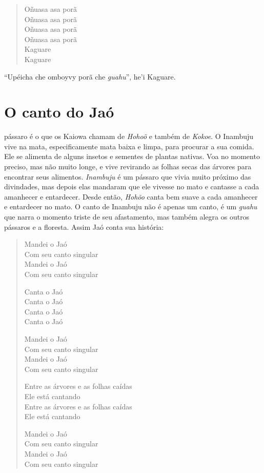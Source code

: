 \begin{verse}
Oñuasa\footnotemark{} asa porã\\
Oñuasa asa porã\\
Oñuasa asa porã\\
Oñuasa asa porã\\
Kaguare\\
Kaguare
\end{verse}



``Upéicha che omboyvy porã che \emph{guahu}'', he'i Kaguare.


\chapter{O canto do Jaó}

 pássaro é o que os Kaiowa chamam de \emph{Hohoõ} e também de
\emph{Kokoe}. O Inambuju vive na mata, especificamente mata baixa e
limpa, para procurar a sua comida. Ele se alimenta de alguns insetos e
sementes de plantas nativas. Voa no momento preciso, mas não muito
longe, e vive revirando as folhas secas das árvores para encontrar seus
alimentos. \emph{Inambuju} é um pássaro que vivia muito próximo das
divindades, mas depois elas mandaram que ele vivesse no mato e cantasse
a cada amanhecer e entardecer. Desde então, \emph{Hohõo} canta bem suave
a cada amanhecer e entardecer no mato. O canto de Inambuju não é apenas
um canto, é um \emph{guahu} que narra o momento triste de seu
afastamento, mas também alegra os outros pássaros e a floresta. Assim
Jaó conta sua história:

\begin{verse}
Mandei o Jaó\\
Com seu canto singular\\
Mandei o Jaó\\
Com seu canto singular

Canta o Jaó\\
Canta o Jaó\\
Canta o Jaó\\
Canta o Jaó

Mandei o Jaó\\
Com seu canto singular\\
Mandei o Jaó\\
Com seu canto singular

Entre as árvores e as folhas caídas\\
Ele está cantando\\
Entre as árvores e as folhas caídas\\
Ele está cantando

Mandei o Jaó\\
Com seu canto singular\\
Mandei o Jaó\\
Com seu canto singular
\end{verse}

